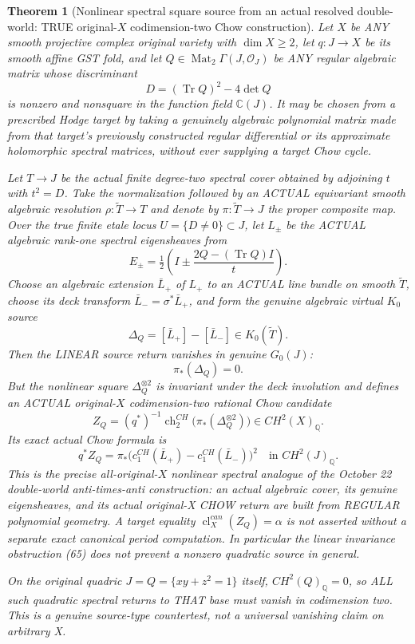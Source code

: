 \documentclass[11pt]{article}
\newtheorem{theorem}{Theorem}[section]
\begin{document}
\begin{theorem}[Nonlinear spectral square source from an actual resolved double-world: TRUE original-$X$ codimension-two Chow construction]
Let $X$ be ANY smooth projective
complex original variety with
$\dim X\ge2$, let $q:J\to X$
be its smooth affine GST fold,
and let $Q\in\operatorname{Mat}_2
\Gamma(J,\mathcal O_J)$ be ANY
regular algebraic matrix whose
discriminant
\[
 D=(\operatorname{Tr}Q)^2-4\det Q
\]
is nonzero and nonsquare in the
function field $\mathbb C(J)$.
It may be chosen from a prescribed
Hodge target by taking a genuinely
algebraic polynomial matrix made
from that target's previously
constructed regular differential
or its approximate holomorphic
spectral matrices, without ever
supplying a target Chow cycle.

Let $T\to J$ be the actual
finite degree-two spectral cover
obtained by adjoining $t$ with
$t^2=D$. Take the normalization
followed by an ACTUAL
equivariant smooth algebraic
resolution $\rho:\widetilde T\to T$
and denote by
$\pi:\widetilde T\to J$
the proper composite map.
Over the true finite etale locus
$U=\{D\ne0\}\subset J$, let
$L_\pm$ be the ACTUAL algebraic
rank-one spectral eigensheaves
from
\[
 E_\pm=\tfrac12
  \left(I\pm
       \frac{2Q-(\operatorname{Tr}Q)I}{t}\right).
\]
Choose an algebraic extension
$\bar L_+$ of $L_+$ to an ACTUAL
line bundle on smooth $\widetilde T$,
choose its deck transform
$\bar L_-=\sigma^*\bar L_+$,
and form the genuine algebraic
virtual $K_0$ source
\[
 \Delta_Q=[\bar L_+]-[\bar L_-]
            \in K_0(\widetilde T).
\]
Then the LINEAR source return
vanishes in genuine $G_0(J)$:
\[
 \boxed{\pi_*(\Delta_Q)=0.}                \tag{65}
\]
But the nonlinear square
$\Delta_Q^{\otimes2}$ is invariant
under the deck involution and
defines an ACTUAL original-$X$
codimension-two rational
Chow candidate
\[
 \boxed{
 Z_Q=(q^*)^{-1}
    \operatorname{ch}^{CH}_2
       \bigl(\pi_*(\Delta_Q^{\otimes2})\bigr)
      \in CH^2(X)_{\mathbb Q}.}           \tag{66}
\]
Its exact actual Chow formula is
\[
 \boxed{
 q^*Z_Q=
   \pi_*\bigl(
      c_1^{CH}(\bar L_+)
        -c_1^{CH}(\bar L_-)
        \bigr)^2
        \quad\text{in }CH^2(J)_{\mathbb Q}.
 }                                       \tag{67}
\]
This is the precise all-original-$X$
nonlinear spectral analogue of
the October 22 double-world
anti-times-anti construction:
an actual algebraic cover,
its genuine eigensheaves,
and its actual original-X
CHOW return are built from
REGULAR polynomial geometry.
A target equality
$\operatorname{cl}^{can}_X(Z_Q)
=\alpha$ is not asserted
without a separate exact
canonical period computation.
In particular the linear
invariance obstruction (65)
does not prevent a nonzero
quadratic source in general.

On the original quadric
$J=Q=\{xy+z^2=1\}$ itself,
$CH^2(Q)_{\mathbb Q}=0$,
so ALL such quadratic
spectral returns to THAT base
must vanish in codimension two.
This is a genuine source-type
countertest, not a universal
vanishing claim on arbitrary X.
\end{theorem}
\end{document}
